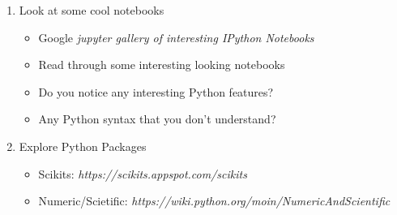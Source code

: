 \documentclass[letterpaper]{article}
\begin{document}
\begin{enumerate}
\item Look at some cool notebooks
	\begin{itemize}
		\item Google \textit{jupyter gallery of interesting IPython Notebooks}
		\item Read through some interesting looking notebooks
		\item Do you notice any interesting Python features?
		\item Any Python syntax that you don't understand?
	\end{itemize}

\item Explore Python Packages
	\begin{itemize}
		\item Scikits: \textit{https://scikits.appspot.com/scikits}
		\item Numeric/Scietific: \textit{https://wiki.python.org/moin/NumericAndScientific}
	\end{itemize}
    
\end{enumerate}
\end{document}
